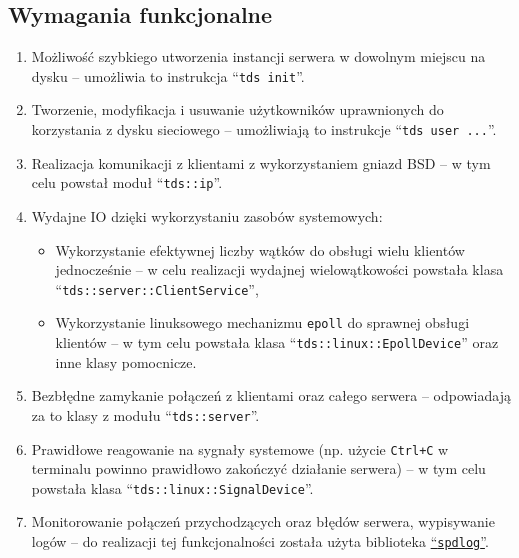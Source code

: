 \documentclass[8pt,a4paper]{article}
\newcommand{\quotes}[1]{``#1''}
\newcommand{\quotcode}[1]{\quotes{\texttt{#1}}}
\begin{document}
\subsection{Wymagania funkcjonalne}
\begin{enumerate}
    \item Możliwość szybkiego utworzenia instancji serwera w dowolnym miejscu na dysku -- umożliwia to instrukcja \quotcode{tds init}.
    \item Tworzenie, modyfikacja i usuwanie użytkowników uprawnionych do korzystania z dysku sieciowego -- umożliwiają to instrukcje \quotcode{tds user ...}.
    \item Realizacja komunikacji z klientami z wykorzystaniem gniazd BSD -- w tym celu powstał moduł \quotcode{tds::ip}.
    \item Wydajne IO dzięki wykorzystaniu zasobów systemowych:
    \begin{itemize}
        \item Wykorzystanie efektywnej liczby wątków do obsługi wielu klientów jednocześnie -- w celu realizacji wydajnej wielowątkowości powstała klasa \quotcode{tds::server::ClientService},
        \item Wykorzystanie linuksowego mechanizmu \texttt{epoll} do sprawnej obsługi klientów -- w tym celu powstała klasa \quotcode{tds::linux::EpollDevice} oraz inne klasy pomocnicze.
    \end{itemize}
    \item Bezbłędne zamykanie połączeń z klientami oraz całego serwera -- odpowiadają za to klasy z modułu \quotcode{tds::server}.
    \item Prawidłowe reagowanie na sygnały systemowe (np. użycie \texttt{Ctrl+C} w terminalu powinno prawidłowo zakończyć działanie serwera) -- w tym celu powstała klasa \quotcode{tds::linux::SignalDevice}.
    \item Monitorowanie połączeń przychodzących oraz błędów serwera, wypisywanie logów -- do realizacji tej funkcjonalności została użyta biblioteka \href{https://github.com/gabime/spdlog}{\quotcode{spdlog}}.
\end{enumerate}
\end{document}

